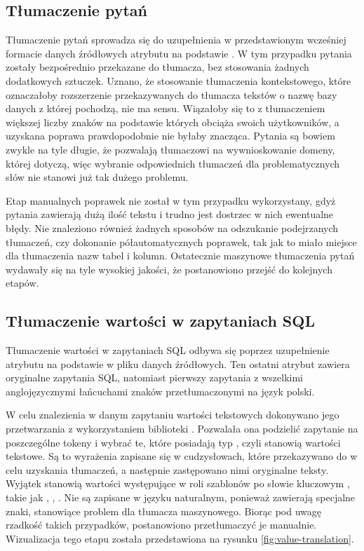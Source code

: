 \subsection{Tłumaczenie pytań}
Tłumaczenie pytań sprowadza się do uzupełnienia w przedstawionym wcześniej formacie danych źródłowych atrybutu  na podstawie . W tym przypadku pytania zostały bezpośrednio przekazane do tłumacza, bez stosowania żadnych dodatkowych sztuczek. Uznano, że stosowanie tłumaczenia kontekstowego, które oznaczałoby rozszerzenie przekazywanych do tłumacza tekstów o nazwę bazy danych z której pochodzą, nie ma sensu. Wiązałoby się to z tłumaczeniem większej liczby znaków na podstawie których  obciąża swoich użytkowników, a uzyskana poprawa prawdopodobnie nie byłaby znacząca. Pytania są bowiem zwykle na tyle długie, że pozwalają tłumaczowi na wywnioskowanie domeny, której dotyczą, więc wybranie odpowiednich tłumaczeń dla problematycznych słów nie stanowi już tak dużego problemu.

Etap manualnych poprawek nie został w tym przypadku wykorzystany, gdyż pytania zawierają dużą ilość tekstu i trudno jest dostrzec w nich ewentualne błędy. Nie znaleziono również żadnych sposobów na odszukanie podejrzanych tłumaczeń, czy dokonanie półautomatycznych poprawek, tak jak to miało miejsce dla tłumaczenia nazw tabel i kolumn. Ostatecznie maszynowe tłumaczenia pytań wydawały się na tyle wysokiej jakości, że postanowiono przejść do kolejnych etapów.

\subsection{Tłumaczenie wartości w zapytaniach SQL}
Tłumaczenie wartości w zapytaniach SQL odbywa się poprzez uzupełnienie atrybutu  na podstawie  w pliku danych źródłowych. Ten ostatni atrybut zawiera oryginalne zapytania SQL, natomiast pierwszy zapytania z wszelkimi anglojęzycznymi łańcuchami znaków przetłumaczonymi na język polski.

W celu znalezienia w danym zapytaniu wartości tekstowych dokonywano jego przetwarzania z wykorzystaniem biblioteki . Pozwalała ona podzielić zapytanie na poszczególne tokeny i wybrać te, które posiadają typ , czyli stanowią wartości tekstowe. Są to wyrażenia zapisane się w cudzysłowach, które przekazywano do  w celu uzyskania tłumaczeń, a następnie zastępowano nimi oryginalne teksty. Wyjątek stanowią wartości występujące w roli szablonów po słowie kluczowym , takie jak , , . Nie są zapisane w języku naturalnym, ponieważ zawierają specjalne znaki, stanowiące problem dla tłumacza maszynowego. Biorąc pod uwagę rzadkość takich przypadków, postanowiono przetłumaczyć je manualnie. Wizualizacja tego etapu została przedstawiona na rysunku \ref{fig:value-translation}.

